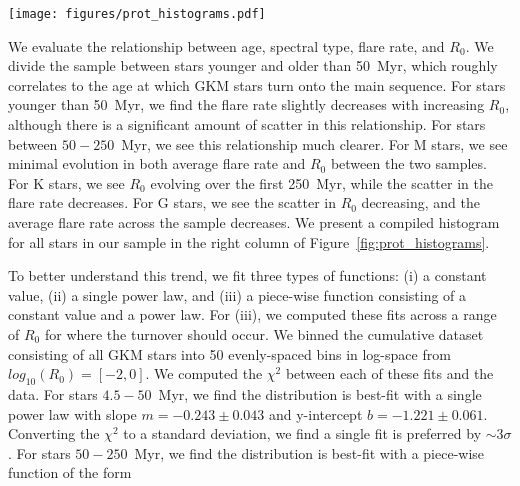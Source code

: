 \documentclass[twocolumn]{aastex631}
\begin{document}
\begin{figure*}[ht!]
    \begin{centering}
        \texttt{[image: figures/prot\_histograms.pdf]}
        \caption{
            Comparison of Rossby Number, $R_0$ and flare rate for young GKM stars.
            We find no change in the average flare rate for GKM stars $< 250$\,Myr.
            We see evidence that as $R_0$ increases, the average flare rate decreases.
            This is similar to results presented in \cite{medina20}, however our sample extends this
            trend to young GKM stars, while previous results were limited to nearby M dwarfs. The top row are
            stars with ages $4.5 - 50$\,Myr; the bottom row are stars with ages $50 - 250$\,Myr. The
            histograms are colored by number of stars in each bin.
        }
        \label{fig:prot_histograms}
    \end{centering}
\end{figure*}

We evaluate the relationship between age, spectral type, flare rate, and $R_0$. We divide the sample between stars
younger and older than 50~Myr, which roughly correlates to the age at which GKM stars turn onto the main sequence.
For stars younger than 50~Myr, we find the flare rate slightly decreases with increasing $R_0$, although there is a
significant amount of scatter in this relationship. For stars between $50 - 250$~Myr, we see this relationship much
clearer. For M stars, we see minimal evolution in both average flare rate and $R_0$ between the two samples. For K
stars, we see $R_0$ evolving over the first 250~Myr, while the scatter in the flare rate decreases. For G stars, we
see the scatter in $R_0$ decreasing, and the average flare rate across the sample decreases. We present a compiled histogram
for all stars in our sample in the right column of Figure~\ref{fig:prot_histograms}.

To better understand this trend, we fit three types of functions: (i) a constant value, (ii) a single power law, and
(iii) a piece-wise function consisting of a constant value and a power law. For (iii), we computed these fits across a range
of $R_0$ for where the turnover should occur. We binned the cumulative dataset consisting of all GKM stars into 50 evenly-spaced bins
in log-space from $log_{10}(R_0) = [-2, 0]$. We computed the $\chi^2$ between
each of these fits and the data. For stars $4.5 - 50$~Myr, we find the distribution is best-fit with a single
power law with slope $m = -0.243 \pm 0.043$ and y-intercept $b = -1.221 \pm 0.061$. Converting the $\chi^2$ to a standard
deviation, we find a single fit is preferred by $\sim 3\sigma$. For stars $50 - 250$~Myr, we find the distribution
is best-fit with a piece-wise function of the form
\end{document}
